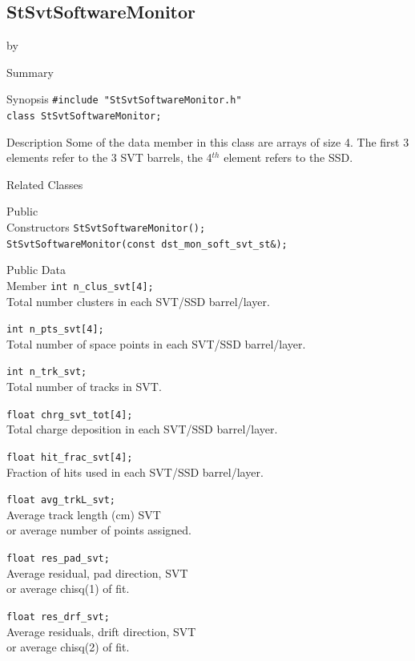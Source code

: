 \documentclass[twoside]{article}
\newcommand{\entrylabel}[1]{\mbox{\textbf{{#1}}}\hfil}%
\newenvironment{entry}
{\begin{list}{}%
    {\renewcommand{\makelabel}{\entrylabel}%
     \setlength{\labelwidth}{90pt}%
     \setlength{\leftmargin}{\labelwidth}
     \advance\leftmargin by \labelsep%
      }%
    }%
  {\end{list}}
\newcommand{\Entrylabel}[1]%
{\raisebox{0pt}[1ex][0pt]{\makebox[\labelwidth][l]%
    {\parbox[t]{\labelwidth}{\hspace{0pt}\textbf{{#1}}}}}}
\newenvironment{Entry}%
{\renewcommand{\entrylabel}{\Entrylabel}\begin{entry}}%
  {\end{entry}}
\begin{document}
\subsection{StSvtSoftwareMonitor}
\label{sec:StSvtSoftwareMonitor}
\begin{Entry}
\item[Summary]
\item[Synopsis]
    \verb+#include "StSvtSoftwareMonitor.h"+\\
    \verb+class StSvtSoftwareMonitor;+\\
\item[Description]
    Some of the data member in this class are arrays of size 4.
    The first 3 elements refer to the 3 SVT barrels, the 4$^{th}$ element
    refers to the SSD.
\item[Related Classes]
\item[Public\\ Constructors]
    \verb+StSvtSoftwareMonitor();+\\
    \verb+StSvtSoftwareMonitor(const dst_mon_soft_svt_st&);+\\
\item[Public Data\\ Member]
    \verb+int n_clus_svt[4];+\\
    Total number clusters in each SVT/SSD barrel/layer. 
    
    \verb+int n_pts_svt[4];+\\
    Total number of space points in each SVT/SSD barrel/layer. 
    
    \verb+int n_trk_svt;+\\
    Total number of tracks in SVT.
    
    \verb+float chrg_svt_tot[4];+\\
    Total charge deposition in each SVT/SSD barrel/layer. 
    
    \verb+float hit_frac_svt[4];+\\
    Fraction of hits used in each SVT/SSD barrel/layer. 
    
    \verb+float avg_trkL_svt;+\\
    Average track length (cm) SVT \\
    or average number of points assigned.
    
    \verb+float res_pad_svt;+\\
    Average residual, pad direction, SVT \\
    or average chisq(1) of fit.

    \verb+float res_drf_svt;+\\
    Average residuals, drift direction, SVT \\
    or average chisq(2) of fit.
\end{Entry}
\clearpage
\end{document}
